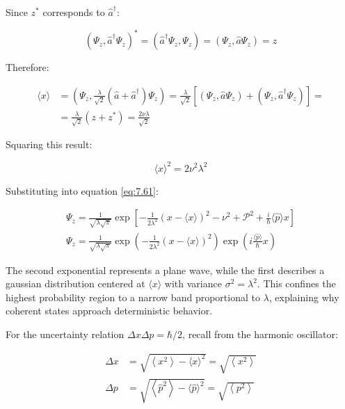 \documentclass[italian]{HKNdocument}
\begin{document}
Since $z^{*}$ corresponds to $\hat{a}^{\dagger}$:

\begin{equation}
\left(\Psi_{z}, \hat{a}^{\dagger} \Psi_{z}\right)^{*}=\left(\hat{a}^{\dagger} \Psi_{z}, \Psi_{z}\right)=\left(\Psi_{z}, \hat{a} \Psi_{z}\right)=z \label{eq:7.63}
\end{equation}

Therefore:

\begin{align}
\langle x\rangle & =\left(\Psi_{z}, \frac{\lambda}{\sqrt{2}}\left(\hat{a}+\hat{a}^{\dagger}\right) \Psi_{z}\right)=\frac{\lambda}{\sqrt{2}}\left[\left(\Psi_{z}, \hat{a} \Psi_{z}\right)+\left(\Psi_{z}, \hat{a}^{\dagger} \Psi_{z}\right)\right]=  \label{eq:7.64}\\
& =\frac{\lambda}{\sqrt{2}}\left(z+z^{*}\right)=\frac{2 \nu \lambda}{\sqrt{2}}
\end{align}

Squaring this result:

\begin{equation}
\langle x\rangle^{2}=2 \nu^{2} \lambda^{2} \label{eq:7.65}
\end{equation}

Substituting into equation \eqref{eq:7.61}:

\begin{gather}
\Psi_{z}=\frac{1}{\sqrt{\lambda \sqrt{\pi}}} \exp \left[-\frac{1}{2 \lambda^{2}}(x-\langle x\rangle)^{2}-\mathcal{\nu}^{2}+\mathcal{P}^{2}+\frac{i}{\hbar}\langle\hat{p}\rangle x\right]  \label{eq:7.66}\\
\Psi_{z}=\frac{1}{\sqrt{\lambda \sqrt{\pi}}} \exp \left(-\frac{1}{2 \lambda^{2}}(x-\langle x\rangle)^{2}\right) \exp \left(i \frac{\langle\hat{p}\rangle}{\hbar} x\right) \label{eq:7.67}
\end{gather}

The second exponential represents a plane wave, while the first describes a gaussian distribution centered at $\langle x\rangle$ with variance $\sigma^{2}=\lambda^{2}$. This confines the highest probability region to a narrow band proportional to $\lambda$, explaining why coherent states approach deterministic behavior.

For the uncertainty relation $\Delta x \Delta p=\hbar / 2$, recall from the harmonic oscillator:

\begin{align}
\Delta x & =\sqrt{\left\langle x^{2}\right\rangle-\langle x\rangle^{2}}=\sqrt{\left\langle x^{2}\right\rangle} \\
\Delta p & =\sqrt{\left\langle\hat{p}^{2}\right\rangle-\langle\hat{p}\rangle^{2}}=\sqrt{\left\langle p^{2}\right\rangle} \label{eq:7.68}
\end{align}
\end{document}
